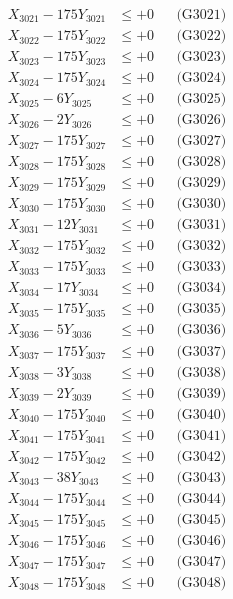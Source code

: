 \documentclass[a4paper,10pt]{article}
\begin{document}
{\begin{align}
\allowbreak
X_{3021} - 175Y_{3021} &\leq +0 && \text{(G3021)} \\
X_{3022} - 175Y_{3022} &\leq +0 && \text{(G3022)} \\
X_{3023} - 175Y_{3023} &\leq +0 && \text{(G3023)} \\
X_{3024} - 175Y_{3024} &\leq +0 && \text{(G3024)} \\
X_{3025} - 6Y_{3025} &\leq +0 && \text{(G3025)} \\
X_{3026} - 2Y_{3026} &\leq +0 && \text{(G3026)} \\
X_{3027} - 175Y_{3027} &\leq +0 && \text{(G3027)} \\
X_{3028} - 175Y_{3028} &\leq +0 && \text{(G3028)} \\
X_{3029} - 175Y_{3029} &\leq +0 && \text{(G3029)} \\
X_{3030} - 175Y_{3030} &\leq +0 && \text{(G3030)} \\
\allowbreak
X_{3031} - 12Y_{3031} &\leq +0 && \text{(G3031)} \\
X_{3032} - 175Y_{3032} &\leq +0 && \text{(G3032)} \\
X_{3033} - 175Y_{3033} &\leq +0 && \text{(G3033)} \\
X_{3034} - 17Y_{3034} &\leq +0 && \text{(G3034)} \\
X_{3035} - 175Y_{3035} &\leq +0 && \text{(G3035)} \\
X_{3036} - 5Y_{3036} &\leq +0 && \text{(G3036)} \\
X_{3037} - 175Y_{3037} &\leq +0 && \text{(G3037)} \\
X_{3038} - 3Y_{3038} &\leq +0 && \text{(G3038)} \\
X_{3039} - 2Y_{3039} &\leq +0 && \text{(G3039)} \\
X_{3040} - 175Y_{3040} &\leq +0 && \text{(G3040)} \\
\allowbreak
X_{3041} - 175Y_{3041} &\leq +0 && \text{(G3041)} \\
X_{3042} - 175Y_{3042} &\leq +0 && \text{(G3042)} \\
X_{3043} - 38Y_{3043} &\leq +0 && \text{(G3043)} \\
X_{3044} - 175Y_{3044} &\leq +0 && \text{(G3044)} \\
X_{3045} - 175Y_{3045} &\leq +0 && \text{(G3045)} \\
X_{3046} - 175Y_{3046} &\leq +0 && \text{(G3046)} \\
X_{3047} - 175Y_{3047} &\leq +0 && \text{(G3047)} \\
X_{3048} - 175Y_{3048} &\leq +0 && \text{(G3048)} \\

\end{align}}
\end{document}
